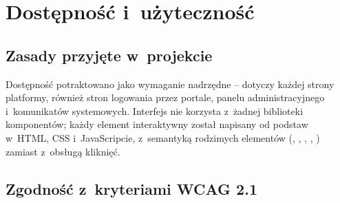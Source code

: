 \chapter{Dostępność i~użyteczność}\label{ch:dostepnosc}

\section{Zasady przyjęte w~projekcie}

Dostępność potraktowano jako wymaganie nadrzędne -- dotyczy każdej strony platformy,
również stron logowania przez portale, panelu administracyjnego i~komunikatów
systemowych. Interfejs nie korzysta z~żadnej biblioteki komponentów; każdy
element interaktywny został napisany od podstaw w~HTML, CSS i~JavaScripcie, z~semantyką
rodzimych elementów (, , , ,
) zamiast  z~obsługą kliknięć.

\section{Zgodność z~kryteriami WCAG 2.1}

